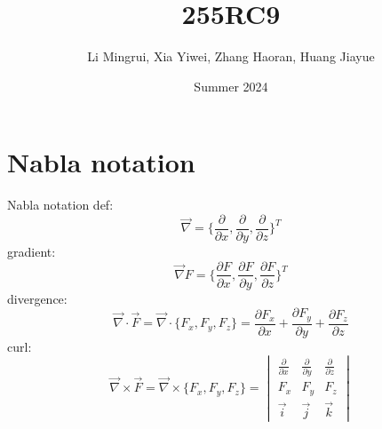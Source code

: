 \documentclass{beamer}
\title{\LARGE 255RC9}
\author{ Li Mingrui, Xia Yiwei, Zhang Haoran, Huang Jiayue}
\date{Summer 2024}
\begin{document}
\maketitle

\section{Nabla notation}
\begin{frame}{Nabla notation}
def:
\begin{equation*}
            \Vec{\nabla}=\{\frac{\partial}{\partial x},\frac{\partial}{\partial y},\frac{\partial}{\partial z}\}^T
            
        \end{equation*}
        gradient:
        \begin{equation*}
            \Vec{\nabla} F=\{\frac{\partial F}{\partial x},\frac{\partial F}{\partial y},\frac{\partial F}{\partial z}\}^T
        \end{equation*}
        divergence:
        \begin{equation*}
            \Vec{\nabla}\cdot \Vec{F}=\Vec{\nabla}\cdot\{F_x,F_y,F_z\}=\frac{\partial F_x}{\partial x}+\frac{\partial F_y}{\partial y}+\frac{\partial F_z}{\partial z}
        \end{equation*}
        curl:
        \begin{equation*}
            \Vec{\nabla}\times \Vec{F}=\Vec{\nabla}\times\{F_x,F_y,F_z\}=
            \begin{vmatrix}
\frac{\partial}{\partial x} & \frac{\partial}{\partial y} & \frac{\partial}{\partial z}\\
F_x & F_y & F_z\\
\Vec{i}&\Vec{j}&\Vec{k}
\end{vmatrix}
        \end{equation*}
        
    
\end{frame}
\end{document}
